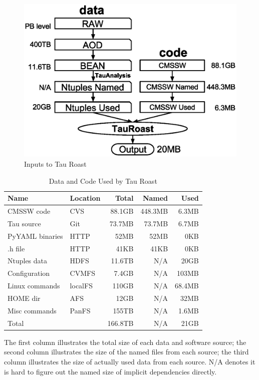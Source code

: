 \documentclass{sig-alternate}
\begin{document}
\begin{figure}[t]
\centering
\includegraphics[width=.8\columnwidth]{data-code-size.eps}
\caption{Inputs to Tau Roast}
\label{fig:data-code-size}
\end{figure}

\begin{table}[t]
    \centering
    \small
    \begin{tabular}{|l|l|r|r|r|}
        \hline
        \bf Name & \bf Location & \bf Total & \bf Named & \bf Used \\ 
        \hline
        CMSSW code     & CVS & 88.1GB & 448.3MB & 6.3MB\\ \hline
        Tau source       & Git & 73.7MB & 73.7MB & 6.7MB \\ \hline
        PyYAML binaries    & HTTP & 52MB & 52MB & 0KB \\ \hline
        .h file       & HTTP& 41KB & 41KB & 0KB \\ \hline \hline
        Ntuples data    & HDFS& 11.6TB & N/A& 20GB \\ \hline
        Configuration & CVMFS & 7.4GB & N/A & 103MB \\ \hline
        Linux commands & localFS & 110GB &  N/A & 68.4MB \\ \hline     
        HOME dir& AFS &12GB & N/A & 32MB\\ \hline
        Misc commands & PanFS & 155TB & N/A  & 1.6MB \\ \hline
        Total      &    & 166.8TB            & N/A & 21GB \\ \hline
    \end{tabular}
    \begin{tablenotes}
      \small
      \item The first column illustrates the total size of each data and software source; 
            the second column illustrates the size of the named files from each source;
            the third column illustrates the size of actually used data from each source.
            N/A denotes it is hard to figure out the named size of implicit dependencies directly.        
    \end{tablenotes}
    \caption{Data and Code Used by Tau Roast}
    \label{table:size-original-real}
\end{table}
\end{document}
